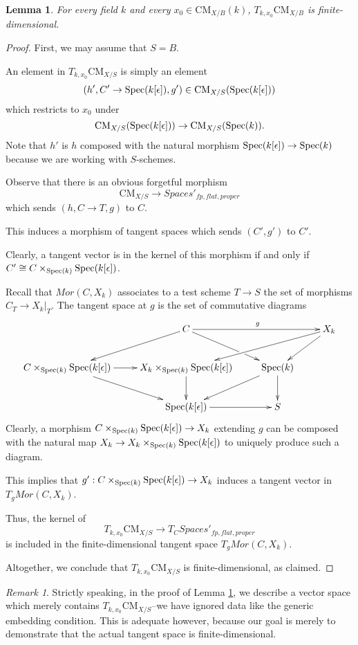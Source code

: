 \documentclass{stacks-project}
\theoremstyle{plain}
\newtheorem{lemma}[subsection]{Lemma}
\theoremstyle{definition}
\DeclareMathOperator{\Spec}{Spec}
\theoremstyle{remark}
\newtheorem{remark}[subsection]{Remark}
\numberwithin{equation}{subsection}
\def\Spec{\mathop{\rm Spec}}
\def\CMfunctor{\text{CM}}
\begin{document}
\begin{lemma}
	For every field $k$ and every $x_0\in \CMfunctor_{X/B}(k)$, $T_{k,x_0}\CMfunctor_{X/B}$ is finite-dimensional.
	\label{lem:axiom3}
\end{lemma}
\begin{proof}
	First, we may assume that $S=B$.

	An element in $ T_{k,x_0}\CMfunctor_{X/S}$ is simply an element
	\[(h',C'\rightarrow \Spec(k[\epsilon]),g')\in \CMfunctor_{X/S}(\Spec(k[\epsilon]))\]
	which restricts to $x_0$ under 
	\[\CMfunctor_{X/S}(\Spec(k[\epsilon]))\rightarrow\CMfunctor_{X/S}(\Spec(k)).\]
	Note that $h'$ is $h$ composed with the natural morphism $\Spec(k[\epsilon])\rightarrow\Spec(k)$ because we are working with $S$-schemes.

	Observe that there is an obvious forgetful morphism
	\[\CMfunctor_{X/S}\rightarrow Spaces'_{fp,flat,proper}\]
	which sends $(h,C\rightarrow T,g)$ to $C$.

	This induces a morphism of tangent spaces which sends $(C',g')$ to $C'$.

	Clearly, a tangent vector is in the kernel of this morphism if and only if $C'\cong C\times_{\Spec(k)} \Spec(k[\epsilon])$.
	
	Recall that $Mor(C,X_k)$ associates to a test scheme $T\rightarrow S$ the set of morphisms $C_T\rightarrow X_k|_T$.
	The tangent space at $g$ is the set of commutative diagrams
	\[\xymatrix{
		&C\ar[rr]^{g}\ar[dr]|!{[d];[rr]}\hole\ar[dl] & & X_k\ar[dll]\ar[dl]\\
		C\times_{\Spec(k)}\Spec(k[\epsilon])\ar[r]\ar[dr]&X_k\times_{\Spec(k)}\Spec(k[\epsilon])\ar[d]& \Spec(k)\ar[dl]\ar[d] & \\
		&\Spec(k[\epsilon])\ar[r] & S&
	}\]
	Clearly, a morphism $C\times_{\Spec(k)}\Spec(k[\epsilon])\rightarrow X_k$ extending $g$ can be composed with the natural map $X_k\rightarrow X_k\times_{\Spec(k)}\Spec(k[\epsilon])$ to uniquely produce such a diagram.

	This implies that $g':C\times_{\Spec(k)}\Spec(k[\epsilon])\rightarrow X_k$ induces a tangent vector in $T_gMor(C,X_k)$.

	Thus, the kernel of
	\[T_{k,x_0}\CMfunctor_{X/S}\rightarrow T_{C}Spaces'_{fp,flat,proper}\]
	is included in the finite-dimensional tangent space $T_gMor(C,X_k)$.

	Altogether, we conclude that $T_{k,x_0}\CMfunctor_{X/S}$ is finite-dimensional, as claimed.
	\end{proof}
	\begin{remark}
		Strictly speaking, in the proof of Lemma \ref{lem:axiom3}, we describe a vector space which merely contains $T_{k,x_0}\CMfunctor_{X/S}$--we have ignored data like the generic embedding condition.
		This is adequate however, because our goal is merely to demonstrate that the actual tangent space is finite-dimensional.
	\end{remark}
\end{document}
